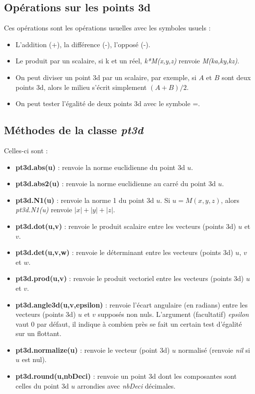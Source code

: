 \subsection{Opérations sur les points 3d}

Ces opérations sont les opérations usuelles avec les symboles usuels :
\begin{itemize}
    \item L'addition (+), la différence (-), l'opposé (-).
    \item Le produit par un scalaire, si k et un réel, \emph{k*M(x,y,z)} renvoie \emph{M(ka,ky,kz)}.
    \item On peut diviser un point 3d par un scalaire, par exemple, si $A$ et $B$ sont deux points 3d, alors le milieu s'écrit simplement $(A+B)/2$.
    \item On peut tester l'égalité de deux points 3d avec le symbole =.
\end{itemize}

\subsection{Méthodes de la classe \emph{pt3d}}

Celles-ci sont :
\begin{itemize}
    \item \textbf{pt3d.abs(u)} : renvoie la norme euclidienne du point 3d $u$.
    \item \textbf{pt3d.abs2(u)} : renvoie la norme euclidienne au carré du point 3d $u$.
    \item \textbf{pt3d.N1(u)} : renvoie la norme 1 du point 3d $u$. Si $u=M(x,y,z)$, alors \emph{pt3d.N1(u)} renvoie $|x|+|y|+|z|$.
    \item \textbf{pt3d.dot(u,v)} : renvoie le produit scalaire entre les vecteurs (points 3d) $u$ et $v$.
    \item \textbf{pt3d.det(u,v,w)} : renvoie le déterminant entre les vecteurs (points 3d) $u$, $v$ et $w$.
    \item \textbf{pt3d.prod(u,v)} : renvoie le produit vectoriel entre les vecteurs (points 3d) $u$ et $v$.
    \item \textbf{pt3d.angle3d(u,v,epsilon)} : renvoie l'écart angulaire (en radians) entre les vecteurs (points 3d) $u$ et $v$ supposés non nuls. L'argument (facultatif) \emph{epsilon} vaut $0$ par défaut, il indique à combien près se fait un certain test d'égalité sur un flottant.

    \item \textbf{pt3d.normalize(u)} : renvoie le vecteur (point 3d) $u$ normalisé (renvoie \emph{nil} si $u$ est nul).
    \item \textbf{pt3d.round(u,nbDeci)} : renvoie un point 3d dont les composantes sont celles du point 3d $u$ arrondies avec \emph{nbDeci} décimales.
\end{itemize}

